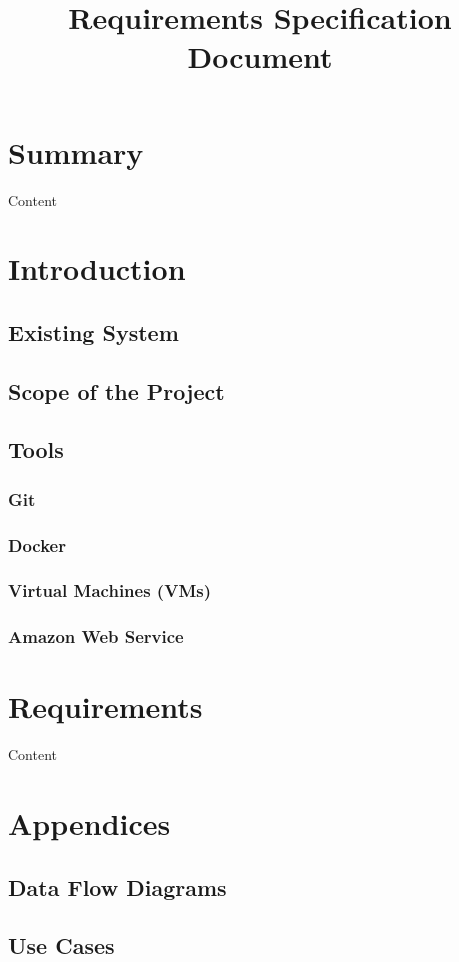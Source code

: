 \documentclass{article}
\title{Requirements Specification Document}
\begin{document}
\maketitle
\newpage
\tableofcontents
\newpage
\section{Summary}
	Content
\section{Introduction}
    \subsection{Existing System}
	\subsection{Scope of the Project}
    \subsection{Tools}
        \subsubsection{Git}
        \subsubsection{Docker}
        \subsubsection{Virtual Machines (VMs)}
        \subsubsection{Amazon Web Service}
\section{Requirements}
    Content
\section{Appendices}
	\subsection{Data Flow Diagrams}
	\subsection{Use Cases}
\end{document}
